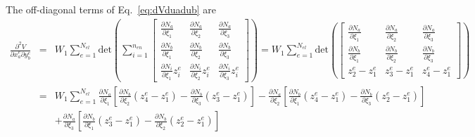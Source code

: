 \documentclass[12pt,aps,pre]{revtex4}
\begin{document}
The off-diagonal terms of Eq.\ \eqref{eq:dVduadub} are
%
\begin{eqnarray}
\frac{\partial^2 V}{\partial x_a^e \partial y_b^e} &=&W_1 \sum_{e=1}^{N_{el}} \text{det}\left(\sum_{i=1}^{n_{en}}
%
\begin{bmatrix}
\frac{\partial N_a}{\partial \xi_1}  & \frac{\partial N_a}{\partial \xi_2} & \frac{\partial N_a}{\partial \xi_3}  \\
%
\frac{\partial N_b}{\partial \xi_1}  & \frac{\partial N_b}{\partial \xi_2} & \frac{\partial N_b}{\partial \xi_3}  \\
%
\frac{\partial N_i}{\partial \xi_1}z_i^e  & \frac{\partial N_i}{\partial \xi_2}z_i^e & \frac{\partial N_i}{\partial \xi_3}z_i^e 
\end{bmatrix}\right) 
%
=W_1 \sum_{e=1}^{N_{el}} \text{det}\left(
%
\begin{bmatrix}
\frac{\partial N_a}{\partial \xi_1}  & \frac{\partial N_a}{\partial \xi_2} & \frac{\partial N_a}{\partial \xi_3}  \\
%
\frac{\partial N_b}{\partial \xi_1}  & \frac{\partial N_b}{\partial \xi_2} & \frac{\partial N_b}{\partial \xi_3}  \\
%
z_2^e - z_1^e & z_3^e - z_1^e & z_4^e - z_1^e 
\end{bmatrix}\right)\nonumber\\
&=& W_1\sum_{e=1}^{N_{el}}\frac{\partial N_a}{\partial \xi_1}\left[\frac{\partial N_b}{\partial \xi_2}(z_4^e - z_1^e)-\frac{\partial N_b}{\partial \xi_3}(z_3^e - z_1^e)\right]
%
-\frac{\partial N_a}{\partial \xi_2}\left[\frac{\partial N_b}{\partial \xi_1}(z_4^e - z_1^e)-\frac{\partial N_b}{\partial \xi_3}(z_2^e - z_1^e)\right] \nonumber\\
%
&&+\frac{\partial N_a}{\partial \xi_3}\left[\frac{\partial N_b}{\partial \xi_1}(z_3^e - z_1^e)-\frac{\partial N_b}{\partial \xi_2}(z_2^e - z_1^e)\right] 
\end{eqnarray}
\end{document}
